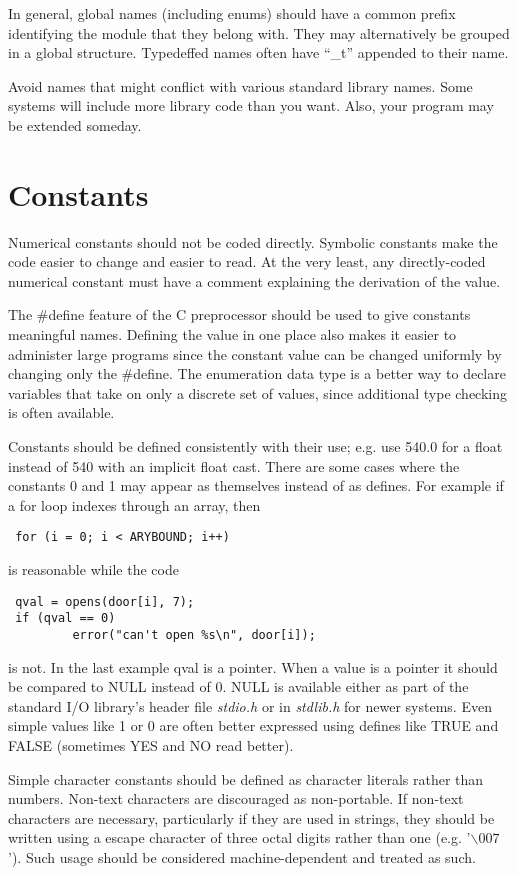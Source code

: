  In general, global names (including enums) should have a common prefix
identifying the module that they belong with. They may alternatively be grouped
in a global structure. Typedeffed names often have ``\_t'' appended to their
name. 

 Avoid names that might conflict with various standard library names. Some
systems will include more library code than you want. Also, your program may be
extended someday. 

\section{Constants}

 Numerical constants should not be coded directly. Symbolic constants make the
code easier to change and easier to read. At the very least, any directly-coded
numerical constant must have a comment explaining the derivation of the value. 

 The \#define feature of the C preprocessor should be used to give constants
meaningful names. Defining the value in one place also makes it easier to
administer large programs since the constant value can be changed uniformly by
changing only the \#define. The enumeration data type is a better way to declare
variables that take on only a discrete set of values, since additional type
checking is often available. 

 Constants should be defined consistently with their use; e.g. use 540.0 for a
float instead of 540 with an implicit float cast. There are some cases where
the constants 0 and 1 may appear as themselves instead of as defines. For
example if a for loop indexes through an array, then 
\begin{verbatim}
 for (i = 0; i < ARYBOUND; i++) 
\end{verbatim}
is reasonable while the code 
\begin{verbatim}
 qval = opens(door[i], 7);
 if (qval == 0)
         error("can't open %s\n", door[i]);
\end{verbatim}
is not. In the last example qval is a pointer. When a value is a
pointer it should be compared to NULL instead of 0. NULL is available
either as part of the standard I/O library's header file {\em stdio.h}
or in {\em stdlib.h} for newer systems. Even simple values like 1 or 0
are often better expressed using defines like TRUE and FALSE
(sometimes YES and NO read better). 

 Simple character constants should be defined as character literals rather than
numbers. Non-text characters are discouraged as non-portable. If non-text
characters are necessary, particularly if they are used in strings, they
should be written using a escape character of three octal digits rather than
one (e.g. '$\backslash 007$'). Such usage should be considered machine-dependent
and treated as such.

